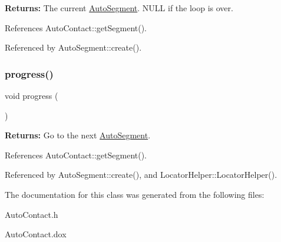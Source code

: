 {\bfseries Returns\+:} The current \hyperlink{classKatabatic_1_1AutoSegment}{Auto\+Segment}. {\ttfamily N\+U\+LL} if the loop is over. 

References Auto\+Contact\+::get\+Segment().



Referenced by Auto\+Segment\+::create().

\mbox{\label{classKatabatic_1_1LocatorHelper_a1be98ae64bededebc29a04f257024ebe}} 
\subsubsection{\texorpdfstring{progress()}{progress()}}
{\footnotesize\ttfamily void progress (\begin{DoxyParamCaption}{ }\end{DoxyParamCaption})\hspace{0.3cm}{\ttfamily [inline]}}

{\bfseries Returns\+:} Go to the next \hyperlink{classKatabatic_1_1AutoSegment}{Auto\+Segment}. 

References Auto\+Contact\+::get\+Segment().



Referenced by Auto\+Segment\+::create(), and Locator\+Helper\+::\+Locator\+Helper().



The documentation for this class was generated from the following files\+:\begin{DoxyCompactItemize}
\item 
Auto\+Contact.\+h\item 
Auto\+Contact.\+dox\end{DoxyCompactItemize}
